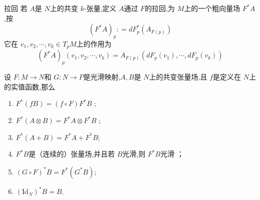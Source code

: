 \documentclass[../../几何与拓扑.tex]{subfiles}
\begin{document}
\begin{definition}{拉回}
    若 $ A $是 $ N $上的共变 $ k $-张量,定义 $ A $通过 $ F $的拉回,为 $ M $上的一个粗向量场 $ F ^{*}A $,按 $$
    \left( F^{*}A \right)_{p}: =    dF _{p}^{*}\left( A_{F\left( p \right) } \right)  
    $$它在 $ v_1,v_2,\cdots,v_k\in T_{p}M $上的作用为 $$
    \left( F ^{*}A \right)_{p}\left( v_1,v_2,\cdots,v_k  \right)= A_{F\left( p \right) }\left( dF _{p}\left( v_1 \right),\cdots ,dF _{p}\left( v_{k} \right)   \right)   
    $$        
\end{definition}

\begin{proposition}
    设 $ F :M \to N $和 $ G:N\to P $是光滑映射,$ A,B $是 $ N $上的共变张量场,且 $ f $是定义在 $ N $上的实值函数,那么
    \begin{enumerate}
        \item $ F^{*}\left( fB \right)= \left( f\circ F \right)F^{*}B   $ ;
        \item $ F ^{*}\left( A\otimes B \right)=F^{*}A\otimes F ^{*}B  $ ;
        \item $ F^{*}\left( A+ B \right)=F ^{*}A+ F ^{*}B  $;
        \item $ F ^{*}B $是（连续的）张量场,并且若 $ B $光滑,则 $ F^{*}B $光滑  ；
        \item $ \left( G\circ F  \right)^{*}B=F^{*}\left( G^{*}B \right)   $;
        \item $ \left( \mathrm{Id}_{N} \right)^{*}B=B  $.     
    \end{enumerate}
          
\end{proposition}
\end{document}
